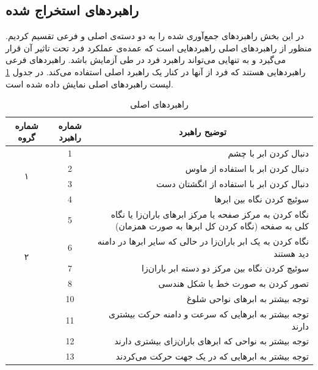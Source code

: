 \documentclass[twoside, a4paper,11pt]{book}
\numberwithin{equation}{chapter}
\numberwithin{table}{chapter}
\numberwithin{figure}{chapter}
\numberwithin{equation}{chapter}
\begin{document}
\subsection{راهبرد‌های استخراج شده}
در این بخش راهبرد‌های جمع‌آوری شده را  به دو دسته‌ی اصلی و فرعی تقسیم  کردیم. منظور از راهبردهای اصلی راهبرد‌هایی است که عمده‌ی عملکرد فرد تحت تاثیر آن قرار می‌گیرد و به تنهایی می‌تواند راهبرد فرد در طی آزمایش باشد. راهبردهای فرعی راهبردهایی هستند که فرد از آنها در کنار یک راهبرد اصلی استفاده می‌کند. در جدول \ref{StrategyList} لیست راهبرد‌های اصلی نمایش داده شده است.
\begin{table}[]
	\centering
	\caption{راهبرد‌های اصلی}
	\label{StrategyList}
	\begin{scriptsize}
	\begin{center}
	\renewcommand{\arraystretch}{2}
	\begin{tabular}{|c|c|r|}
		\hline
\textbf{شماره گروه} & \textbf{شماره راهبرد} & \multicolumn{1}{c|}{\textbf{توضیح راهبرد}} \\ \hline
		\multirow{4}{*}{۱} & 1 & دنبال کردن ابر با چشم \\ \cline{2-3} 
		& 2 & دنبال کردن ابر با استفاده از ماوس \\ \cline{2-3} 
		& 3 & دنبال کردن ابر با استفاده از انگشتان دست \\ \cline{2-3} 
		& 4 & سوئیچ کردن نگاه بین ابرها \\ \hline
		\multirow{5}{*}{۲} & 5 & نگاه کردن به مرکز صفحه یا مرکز ابرهای باران‌زا یا نگاه کلی به صفحه (نگاه کردن کل ابرها به صورت همزمان) \\ \cline{2-3} 
		& 6 & نگاه کردن به یک ابر باران‌زا در حالی که سایر ابرها در دامنه دید هستند \\ \cline{2-3} 
		& 7 & سوئیچ کردن نگاه بین مرکز دو دسته ابر باران‌زا \\ \cline{2-3} 
		& 8 & تصور کردن به صورت خط یا شکل هندسی \\ \hline
		\multirow{4}{*}{۳} & 10 & توجه بیشتر به ابرهای نواحی شلوغ \\ \cline{2-3} 
		& 11 & توجه بیشتر به ابرهایی که سرعت و دامنه حرکت بیشتری دارند \\ \cline{2-3} 
		& 12 & توجه بیشتر به نواحی که ابرهای باران‌زای بیشتری دارند \\ \cline{2-3} 
		& 13 & توجه بیشتر به ابرهایی که در یک جهت حرکت می‌کردند \\ \hline
	\end{tabular}
	\end{center}
	\end{scriptsize}
\end{table}
\end{document}
